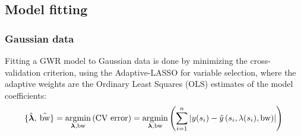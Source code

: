 \documentclass[authoryear ,review]{elsarticle}
\DeclareMathOperator*{\argmin}{\arg\!\min}
\DeclareMathOperator*{\bw}{\mbox{bw}}
\newcommand{\vect}[1]{\boldsymbol{#1}}
\begin{document}
		
	\subsection{Model fitting}
		\subsubsection{Gaussian data}
		Fitting a GWR model to Gaussian data is done by minimizing the cross-validation criterion, using the Adaptive-LASSO for variable selection, where the adaptive weights are the Ordinary Least Squares (OLS) estimates of the model coefficients:
		 \[
			\{ \hat{\vect{\lambda}}, \: \hat{\bw} \} = \argmin_{\vect{\lambda}, \text{bw}} \left( \mbox{CV error} \right)  = \argmin_{\vect{\lambda}, \text{bw}} \left( \sum_{i = 1}^n \left| y(s_i)-\tilde{y}\left(s_i, \lambda(s_i), \bw \right) \right| \right)\\
		\]
		
\end{document}
